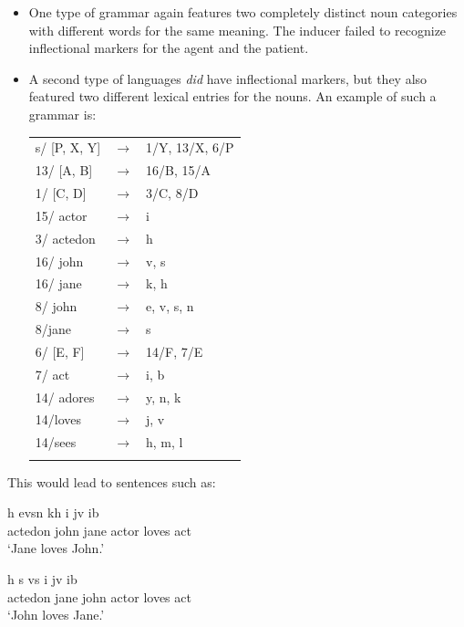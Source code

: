 \begin{itemize}
\item One type of grammar again features two completely distinct noun categories with different words for the same meaning. The inducer failed to recognize inflectional markers for the agent and the patient.
\item A second type of languages {\em did} have inflectional markers, but they also featured two different lexical entries for the nouns. An example of such a grammar is:

\ea
\label{g:moy-grammar2}
\begin{tabular}{l c l}
s/ [P, X, Y] & $\rightarrow$  & 1/Y, 13/X, 6/P
\\ 13/ [A, B] & $\rightarrow$  & 16/B, 15/A
\\ 1/ [C, D] & $\rightarrow$  & 3/C, 8/D
\\ 15/ actor & $\rightarrow$  & i
\\ 3/ actedon & $\rightarrow$  & h
\\ 16/ john & $\rightarrow$  & v, s
\\ 16/ jane & $\rightarrow$  &  k, h
\\ 8/ john & $\rightarrow$  & e, v, s, n
\\ 8/jane & $\rightarrow$  & s
\\ 6/ [E, F] & $\rightarrow$  & 14/F, 7/E
\\ 7/ act & $\rightarrow$  & i, b
\\ 14/ adores & $\rightarrow$  & y, n, k
\\ 14/loves & $\rightarrow$  & j, v
\\ 14/sees & $\rightarrow$  & h, m, l
\\ \citep[p. 230]{moy06case}
\end{tabular}
\z
\end{itemize}

This would lead to sentences such as: 

\ea
\gll h evsn kh i jv ib \\
actedon john jane actor loves act \\
\glt `Jane loves John.' \\

\item
\gll h s vs i jv ib \\
actedon jane john actor loves act \\
\glt `John loves Jane.' \\
\z

